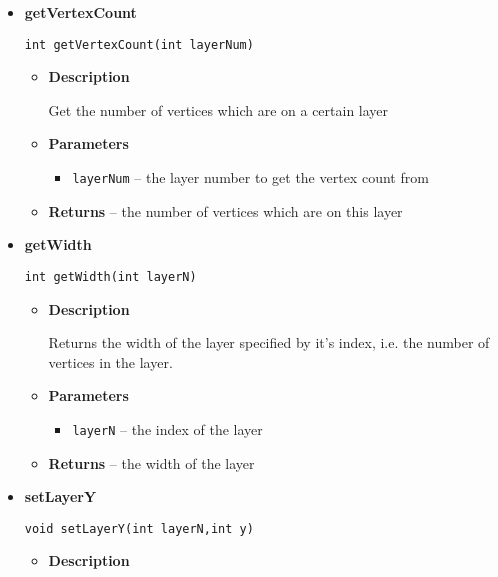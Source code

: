{{{{{{{{{{{{{\begin{itemize}
{\begin{itemize}
{Returns the width of the widest layer, i.e. the number of vertices the layer with the most vertices contains.
}
\item{{\bf  Returns} -- 
the maximum width 
}%
\end{itemize}
}%
\item{ 
{\bf  getVertexCount}\\
\begin{lstlisting}[frame=none]
int getVertexCount(int layerNum)\end{lstlisting} %
\begin{itemize}
\item{
{\bf  Description}

Get the number of vertices which are on a certain layer
}
\item{
{\bf  Parameters}
  \begin{itemize}
   \item{
\texttt{layerNum} -- the layer number to get the vertex count from}
  \end{itemize}
}%
\item{{\bf  Returns} -- 
the number of vertices which are on this layer 
}%
\end{itemize}
}%
\item{ 
{\bf  getWidth}\\
\begin{lstlisting}[frame=none]
int getWidth(int layerN)\end{lstlisting} %
\begin{itemize}
\item{
{\bf  Description}

Returns the width of the layer specified by it's index, i.e. the number of vertices in the layer.
}
\item{
{\bf  Parameters}
  \begin{itemize}
   \item{
\texttt{layerN} -- the index of the layer}
  \end{itemize}
}%
\item{{\bf  Returns} -- 
the width of the layer 
}%
\end{itemize}
}%
\item{ 
{\bf  setLayerY}\\
\begin{lstlisting}[frame=none]
void setLayerY(int layerN,int y)\end{lstlisting} %
\begin{itemize}
\item{
{\bf  Description}

}
\end{itemize}}
\end{itemize}}}}}}}}}}}}}}
